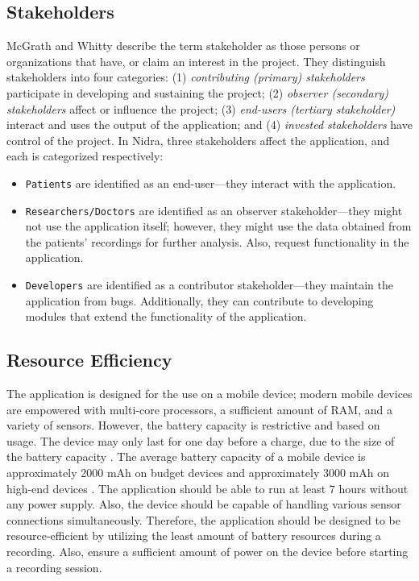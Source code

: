 \subsection{Stakeholders}
McGrath and Whitty \cite{stakeholderdefined} describe the term stakeholder as those persons or organizations that have, or claim an interest in the project. They distinguish stakeholders into four categories: (1) \textit{contributing (primary) stakeholders} participate in developing and sustaining the project; (2) \textit{observer (secondary) stakeholders} affect or influence the project;  (3) \textit{end-users (tertiary stakeholder)} interact and uses the output of the application; and (4) \textit{invested stakeholders} have control of the project. In Nidra, three stakeholders affect the application, and each is categorized respectively:
\begin{itemize}
    \item \verb|Patients| are identified as an end-user---they interact with the application.  
    \item \verb|Researchers/Doctors| are identified as an observer stakeholder---they might not use the application itself; however, they might use the data obtained from the patients' recordings for further analysis. Also, request functionality in the application.
    \item \verb|Developers| are identified as a contributor stakeholder---they maintain the application from bugs. Additionally, they can contribute to developing modules that extend the functionality of the application. 
\end{itemize}

\subsection{Resource Efficiency}
The application is designed for the use on a mobile device; modern mobile devices are empowered with multi-core processors, a sufficient amount of RAM, and a variety of sensors. However, the battery capacity is restrictive and based on usage. The device may only last for one day before a charge, due to the size of the battery capacity \cite{androidbattery}. The average battery capacity of a mobile device is approximately 2000 mAh on budget devices and approximately 3000 mAh on high-end devices \cite{androidbatteryavg}. The application should be able to run at least 7 hours without any power supply. Also, the device should be capable of handling various sensor connections simultaneously. Therefore, the application should be designed to be resource-efficient by utilizing the least amount of battery resources during a recording. Also, ensure a sufficient amount of power on the device before starting a recording session.  

